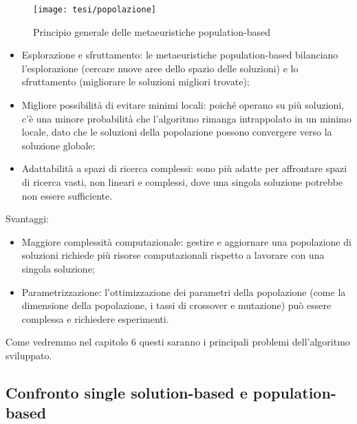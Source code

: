 \begin{figure}[h!] 
    \centering 
    \texttt{[image: tesi/popolazione]} 
    \caption{Principio generale delle metaeuristiche population-based}
\end{figure}

\begin{itemize}
    \item Esplorazione e sfruttamento: le metaeuristiche population-based bilanciano l’esplorazione (cercare nuove aree dello spazio delle soluzioni) e lo sfruttamento (migliorare le soluzioni migliori trovate);
    \item Migliore possibilità di evitare minimi locali: poiché operano su più soluzioni, c'è una minore probabilità che l'algoritmo rimanga intrappolato in un minimo locale, dato che le soluzioni della popolazione possono convergere verso la soluzione globale;
    \item Adattabilità a spazi di ricerca complessi: sono più adatte per affrontare spazi di ricerca vasti, non lineari e complessi, dove una singola soluzione potrebbe non essere sufficiente.
\end{itemize}
Svantaggi:
\begin{itemize}
    \item Maggiore complessità computazionale: gestire e aggiornare una popolazione di soluzioni richiede più risorse computazionali rispetto a lavorare con una singola soluzione;
    \item Parametrizzazione: l'ottimizzazione dei parametri della popolazione (come la dimensione della popolazione, i tassi di crossover e mutazione) può essere complessa e richiedere esperimenti.
\end{itemize}
Come vedremmo nel capitolo 6 questi saranno i principali problemi dell'algoritmo sviluppato.

\subsection{Confronto single solution-based e population-based}

